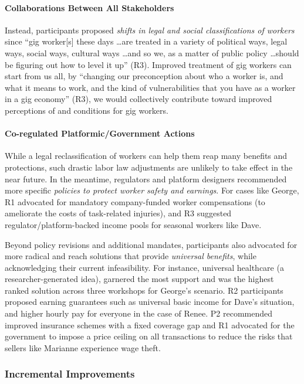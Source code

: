 \paragraph{Collaborations Between All Stakeholders} \label{all}
Instead, participants proposed \textit{shifts in legal and social classifications of workers} \cite{muntaner2018digital} since ``gig worker[s] these days \dots are treated in a variety of political ways, legal ways, social ways, cultural ways \dots and so we, as a matter of public policy \dots should be figuring out how to level it up'' (R3). Improved treatment of gig workers can start from us all, by ``changing our preconception about who a worker is, and what it means to work, and the kind of vulnerabilities that you have as a worker in a gig economy'' (R3), we would collectively contribute toward improved perceptions of and conditions for gig workers. 

\paragraph{Co-regulated Platformic/Government Actions} \label{coregulate}
While a legal reclassification of workers can help them reap many benefits and protections, such drastic labor law adjustments are unlikely to take effect in the near future. In the meantime, regulators and platform designers recommended more specific \textit{policies to protect worker safety and earnings}. For cases like George, R1 advocated for mandatory company-funded worker compensations (to ameliorate the costs of task-related injuries), and R3 suggested regulator/platform-backed income pools for seasonal workers like Dave.

Beyond policy revisions and additional mandates, participants also advocated for more radical and reach solutions that provide \textit{universal benefits}, while acknowledging their current infeasibility. For instance, universal healthcare (a researcher-generated idea), garnered the most support and was the highest ranked solution across three workshops for George's scenario. R2 participants proposed earning guarantees such as universal basic income for Dave's situation, and higher hourly pay for everyone in the case of Renee. P2 recommended improved insurance schemes with a fixed coverage gap and R1 advocated for the government to impose a price ceiling on all transactions to reduce the risks that sellers like Marianne experience wage theft.

\subsubsection{Incremental Improvements}

